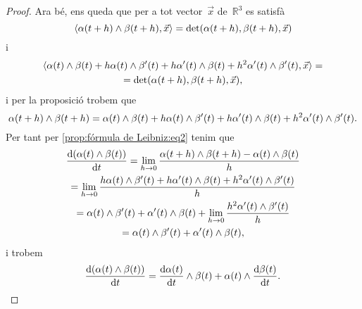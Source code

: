 \documentclass[../../main.tex]{subfiles}
\begin{document}
\begin{proposition}
\begin{proof}
            Ara bé, ens queda que per a tot vector~\(\vec{x}\) de~\(\mathbb{R}^{3}\) es satisfà
            \[
                \prodesc{\alpha(t+h)\prodvec\beta(t+h)}{\vec{x}}=\det(\alpha(t+h),\beta(t+h),\vec{x})
            \]
            i
            \begin{multline*}
                \prodesc{\alpha(t)\prodvec\beta(t)+h\alpha(t)\prodvec\beta'(t)+h\alpha'(t)\prodvec\beta(t)+h^{2}\alpha'(t)\prodvec \beta'(t)}{\vec{x}}=\\=\det(\alpha(t+h),\beta(t+h),\vec{x}),
            \end{multline*}
            i per la proposició  trobem que
            \[
                \alpha(t+h)\mathbin{\wedge}\beta(t+h)=\alpha(t)\mathbin{\wedge}\beta(t)+h\alpha(t)\mathbin{\wedge}\beta'(t)+h\alpha'(t)\mathbin{\wedge}\beta(t)+h^{2}\alpha'(t)\mathbin{\wedge} \beta'(t).
            \]
            Per tant per \eqref{prop:fórmula de Leibniz:eq2} tenim que
            \begin{multline*}
                \frac{\mathop{}\!\mathrm{d}(\alpha(t)\mathbin{\wedge}\beta(t))}{\mathop{}\!\mathrm{d} t}=\lim_{h\to0}\frac{\alpha(t+h)\mathbin{\wedge}\beta(t+h)-\alpha(t)\mathbin{\wedge}\beta(t)}{h}\\
                =\lim_{h\to0}\frac{h\alpha(t)\mathbin{\wedge}\beta'(t)+h\alpha'(t)\mathbin{\wedge}\beta(t)+h^{2}\alpha'(t)\mathbin{\wedge} \beta'(t)}{h}\\
                =\alpha(t)\mathbin{\wedge}\beta'(t)+\alpha'(t)\mathbin{\wedge}\beta(t)+\lim_{h\to0}\frac{h^{2}\alpha'(t)\mathbin{\wedge} \beta'(t)}{h}\\
                =\alpha(t)\mathbin{\wedge}\beta'(t)+\alpha'(t)\mathbin{\wedge}\beta(t),
            \end{multline*}
            i trobem
            \[
                \frac{\mathop{}\!\mathrm{d}(\alpha(t)\mathbin{\wedge}\beta(t))}{\mathop{}\!\mathrm{d} t}=\frac{\mathop{}\!\mathrm{d}\alpha(t)}{\mathop{}\!\mathrm{d} t}\mathbin{\wedge}\beta(t)+\alpha(t)\mathbin{\wedge}\frac{\mathop{}\!\mathrm{d}\beta(t)}{\mathop{}\!\mathrm{d} t}.\qedhere
            \]
        \end{proof}
    \end{proposition}
\end{document}
